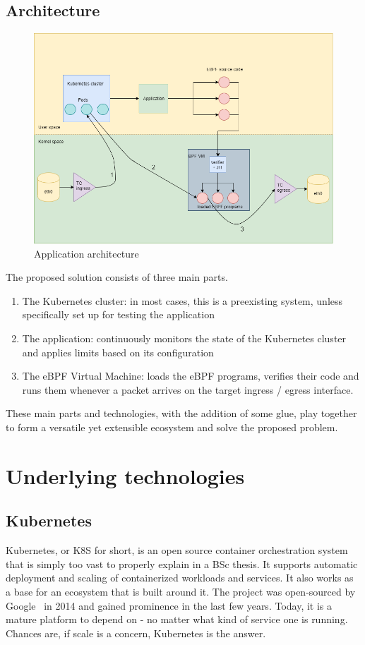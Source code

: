\subsection{Architecture}
\begin{figure}[H]
	\centering
	\includegraphics[width=\textwidth]{images/architecture.png}
	\caption{Application architecture}
	\label{fig:app-arch-2}
\end{figure}
\noindent
The proposed solution consists of three main parts.
\begin{enumerate}
	\item The Kubernetes cluster: in most cases, this is a preexisting system, unless specifically set up for testing the application
	\item The application: continuously monitors the state of the Kubernetes cluster and applies limits based on its configuration
	\item The eBPF Virtual Machine: loads the eBPF programs, verifies their code and runs them whenever a packet arrives on the target ingress / egress interface.
\end{enumerate}

These main parts and technologies, with the addition of some glue, play together to form a versatile yet extensible ecosystem and solve the proposed problem.

\newpage
\section{Underlying technologies}
\subsection{Kubernetes}
Kubernetes, or K8S for short, is an open source container orchestration system that is simply too vast to properly explain in a BSc thesis. It supports automatic deployment and scaling of containerized workloads and services. It also works as a base for an ecosystem that is built around it. The project was open-sourced by Google~\cite{google} in 2014 and gained prominence in the last few years. Today, it is a mature platform to depend on - no matter what kind of service one is running. Chances are, if scale is a concern, Kubernetes is the answer.


